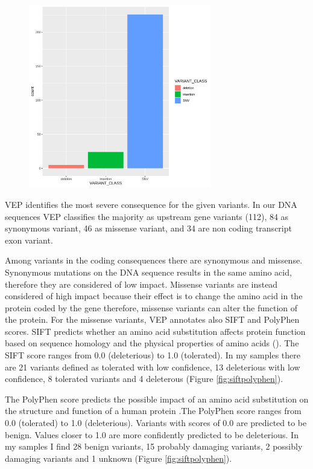 \begin{figure}[h]
\includegraphics[width=8cm]{Fig/VC_vep_deco.jpg}
\caption{}
\label{fig:variantclass}
\end{figure}


VEP identifies the most severe consequence for the given variants. In our DNA sequences VEP classifies the majority as upstream gene variants (112), 84 as synonymous variant, 46 as missense variant, and 34 are non coding transcript exon variant.


Among variants in the coding consequences there are synonymous and missense. Synonymous mutations on the DNA sequence results in the same amino acid, therefore they are considered of low impact. Missense variants are instead considered of high impact because their effect is to change the amino acid in the protein coded by the gene therefore, missense variants can alter the function of the protein. For the missense variants, VEP annotates also SIFT and PolyPhen scores. SIFT predicts whether an amino acid substitution affects protein function based on sequence homology and the physical properties of amino acids (\cite{ng2003sift}). The SIFT score ranges from 0.0 (deleterious) to 1.0 (tolerated). In my samples there are 21 variants defined as tolerated with low confidence, 13 deleterious with low confidence, 8 tolerated variants and 4 deleterous (Figure \ref{fig:siftpolyphen}).
 

The PolyPhen score predicts the possible impact of an amino acid substitution on the structure and function of a human protein \cite{adzhubei2013predicting}.The PolyPhen score ranges from 0.0 (tolerated) to 1.0 (deleterious). Variants with scores of 0.0 are predicted to be benign. Values closer to 1.0 are more confidently predicted to be deleterious. In my samples I find 28 benign variants, 15 probably damaging variants, 2 possibly damaging variants and 1 unknown (Figure \ref{fig:siftpolyphen}).\\


